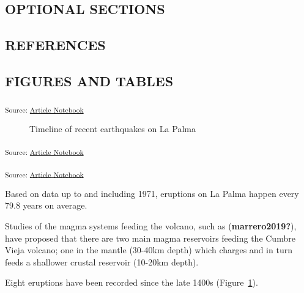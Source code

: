 \documentclass[
]{agujournal2019}
\begin{document}
\subsection{OPTIONAL SECTIONS}\label{optional-sections}

\subsection{REFERENCES}\label{references}

\subsection{FIGURES AND TABLES}\label{figures-and-tables}

\textsubscript{Source:
\href{https://rvcrawford.github.io/glowing-system/index.qmd.html}{Article
Notebook}}

\label{cell-fig-timeline}
\begin{figure}[H]


\caption{\label{fig-timeline}Timeline of recent earthquakes on La Palma}

\end{figure}%

\textsubscript{Source:
\href{https://rvcrawford.github.io/glowing-system/index.qmd.html}{Article
Notebook}}

\textsubscript{Source:
\href{https://rvcrawford.github.io/glowing-system/index.qmd.html}{Article
Notebook}}

Based on data up to and including 1971, eruptions on La Palma happen
every 79.8 years on average.

Studies of the magma systems feeding the volcano, such as
(\textbf{marrero2019?}), have proposed that there are two main magma
reservoirs feeding the Cumbre Vieja volcano; one in the mantle (30-40km
depth) which charges and in turn feeds a shallower crustal reservoir
(10-20km depth).

Eight eruptions have been recorded since the late 1400s
(Figure~\ref{fig-timeline}).
\end{document}
